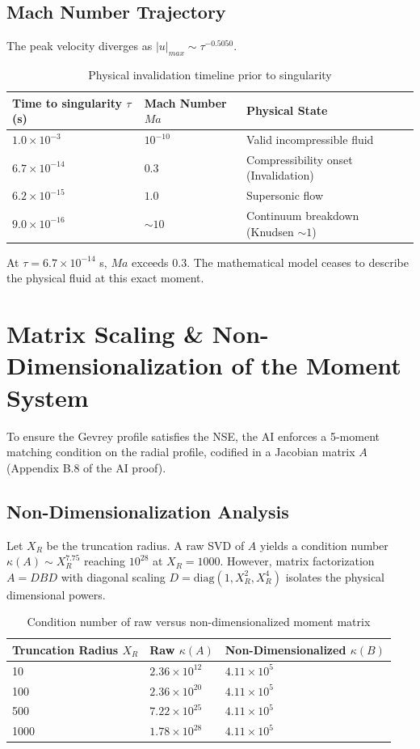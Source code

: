 \documentclass[11pt,a4paper]{article}
\theoremstyle{definition}
\begin{document}
\subsection{Mach Number Trajectory}
The peak velocity diverges as $|u|_{max} \sim \tau^{-0.5050}$. 

\begin{table}[h]
\centering
\caption{Physical invalidation timeline prior to singularity}
\begin{tabular}{@{}lll@{}}
\toprule
Time to singularity $\tau$ (s) & Mach Number $Ma$ & Physical State \\
\midrule
$1.0 \times 10^{-3}$ & $10^{-10}$ & Valid incompressible fluid \\
$6.7 \times 10^{-14}$ & $0.3$ & Compressibility onset (Invalidation) \\
$6.2 \times 10^{-15}$ & $1.0$ & Supersonic flow \\
$9.0 \times 10^{-16}$ & $\sim 10$ & Continuum breakdown (Knudsen $\sim 1$) \\
\bottomrule
\end{tabular}
\end{table}

At $\tau = 6.7 \times 10^{-14}$ s, $Ma$ exceeds 0.3. The mathematical model ceases to describe the physical fluid at this exact moment.

\section{Matrix Scaling \& Non-Dimensionalization of the Moment System}

To ensure the Gevrey profile satisfies the NSE, the AI enforces a 5-moment matching condition on the radial profile, codified in a Jacobian matrix $A$ (Appendix B.8 of the AI proof).

\subsection{Non-Dimensionalization Analysis}
Let $X_R$ be the truncation radius. A raw SVD of $A$ yields a condition number $\kappa(A) \sim X_R^{7.75}$ reaching $10^{28}$ at $X_R = 1000$. However, matrix factorization $A = D B D$ with diagonal scaling $D = \text{diag}(1, X_R^2, X_R^4)$ isolates the physical dimensional powers.

\begin{table}[h]
\centering
\caption{Condition number of raw versus non-dimensionalized moment matrix}
\begin{tabular}{@{}lll@{}}
\toprule
Truncation Radius $X_R$ & Raw $\kappa(A)$ & Non-Dimensionalized $\kappa(B)$ \\
\midrule
10 & $2.36 \times 10^{12}$ & $4.11 \times 10^5$ \\
100 & $2.36 \times 10^{20}$ & $4.11 \times 10^5$ \\
500 & $7.22 \times 10^{25}$ & $4.11 \times 10^5$ \\
1000 & $1.78 \times 10^{28}$ & $4.11 \times 10^5$ \\
\bottomrule
\end{tabular}
\end{table}
\end{document}
